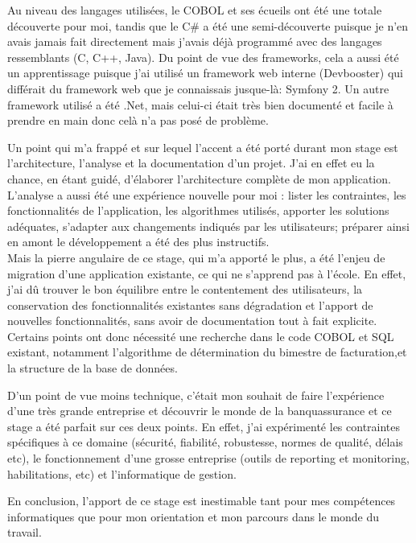 \documentclass[a4paper,french,8pt]{article}
\begin{document}
		
		Au niveau des langages utilisées, le COBOL et ses écueils ont été une totale découverte pour moi, tandis que le C\# a été une semi-découverte puisque je n'en avais jamais fait directement mais 
		j'avais déjà programmé avec des langages ressemblants (C, C++, Java).
		Du point de vue des frameworks, cela a aussi été un apprentissage puisque j'ai utilisé un framework web interne (Devbooster) qui différait du framework web que je connaissais jusque-là: Symfony 2.
		Un autre framework utilisé a été .Net, mais celui-ci était très bien documenté et facile à prendre en main donc celà n'a pas posé de problème.
		
		Un point qui m'a frappé et sur lequel l'accent a été porté durant mon stage est l'architecture, l'analyse et la documentation d'un projet. J'ai en effet eu la chance, en étant guidé, d'élaborer
		l'architecture complète de mon application. L'analyse a aussi été une expérience nouvelle pour moi : lister les contraintes, les fonctionnalités de l'application, les algorithmes utilisés, apporter les solutions adéquates,
		s'adapter aux changements indiqués par les utilisateurs; préparer ainsi en amont le développement a été des plus instructifs.\\
		
		
		Mais la pierre angulaire de ce stage, qui m'a apporté le plus, a été l'enjeu de migration d'une application existante, ce qui ne s'apprend pas à l'école. En effet, j'ai dû trouver le bon équilibre
		entre le contentement des utilisateurs, la conservation des fonctionnalités existantes sans dégradation et l'apport de nouvelles fonctionnalités, sans avoir de documentation tout à fait explicite.
		Certains points ont donc nécessité une recherche dans le code COBOL et SQL existant, notamment l'algorithme de détermination du bimestre de facturation,et la structure de la base de données.
		
		
		D'un point de vue moins technique, c'était mon souhait de faire l'expérience d'une très grande entreprise et découvrir le monde de la banquassurance et ce stage a été parfait sur ces deux points.
		En effet, j'ai expérimenté les contraintes spécifiques à ce domaine (sécurité, fiabilité, robustesse, normes de qualité, délais etc), le fonctionnement d'une grosse entreprise (outils de reporting et monitoring,
		habilitations, etc) et l'informatique de gestion.
		
		En conclusion, l'apport de ce stage est inestimable tant pour mes compétences informatiques que pour mon orientation et mon parcours dans le monde du travail.
	
\end{document}
